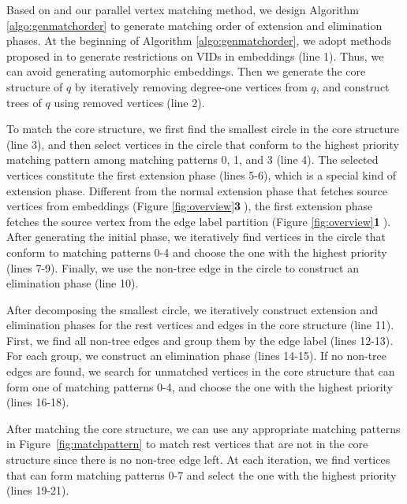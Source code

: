 Based on \cite{bi2016efficient} and our parallel vertex matching method, we design Algorithm \ref{algo:genmatchorder} to generate matching order of extension and elimination phases. At the beginning of Algorithm \ref{algo:genmatchorder}, we adopt methods proposed in \cite{shi2020graphpi,mawhirter2019graphzero} to generate restrictions on VIDs in embeddings (line 1). Thus, we can avoid generating automorphic embeddings. Then we generate the core structure of $q$ by iteratively removing degree-one vertices from $q$, and construct trees of $q$ using removed vertices (line 2).

To match the core structure, we first find the smallest circle in the core structure (line 3), and then select vertices in the circle that
conform to the highest priority matching pattern among matching patterns 0, 1, and 3 (line 4). The selected vertices constitute the first
extension phase (lines 5-6), which is a special kind of extension phase. Different from the normal extension phase that fetches source
vertices from embeddings (Figure \ref{fig:overview}\textbf{\textcircled{3}}), the first extension phase fetches the source vertex from the
edge label partition (Figure \ref{fig:overview}\textbf{\textcircled{1}}). After generating the initial phase, we iteratively find vertices
in the circle that conform to matching patterns 0-4 and choose the one with the highest priority (lines 7-9). Finally, we use the non-tree
edge in the circle to construct an elimination phase (line 10).

After decomposing the smallest circle, we iteratively construct extension and elimination phases for the rest vertices and edges in the core structure (line 11). First, we find all non-tree edges and group them by the edge label (lines 12-13). For each group, we construct an elimination phase (lines 14-15). If no non-tree edges are found, we search for unmatched vertices in the core structure that can form one of matching patterns 0-4, and choose the one with the highest priority (lines 16-18).

After matching the core structure, we can use any appropriate matching patterns in Figure~\ref{fig:matchpattern} to match rest vertices that are not in the core structure since there is no non-tree edge left. At each iteration, we find vertices that can form matching patterns 0-7 and select the one with the highest priority (lines 19-21).


